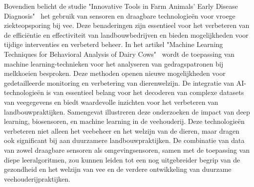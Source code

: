 \newline
Bovendien belicht de studie "Innovative Tools in Farm Animals’ Early Disease Diagnosis"~\autocite{Animals13780} het gebruik van sensoren en draagbare technologieën voor vroege ziekteopsporing bij vee. 
Deze benaderingen zijn essentieel voor het verbeteren van de efficiëntie en effectiviteit van landbouwbedrijven en bieden mogelijkheden voor tijdige interventies en verbeterd beheer.
\newline
In het artikel "Machine Learning Techniques for Behavioral Analysis of Dairy Cows"~\autocite{ar5iv2021} wordt de toepassing van machine learning-technieken voor het analyseren van gedragspatronen bij melkkoeien besproken. 
Deze methoden openen nieuwe mogelijkheden voor gedetailleerde monitoring en verbetering van dierenwelzijn. 
De integratie van AI-technologieën is van essentieel belang voor het decoderen van complexe datasets van veegegevens en biedt waardevolle inzichten voor het verbeteren van landbouwpraktijken.
\newline
Samengevat illustreren deze onderzoeken de impact van deep learning, biosensoren, en machine learning in de veehouderij. 
Deze technologieën verbeteren niet alleen het veebeheer en het welzijn van de dieren, maar dragen ook significant bij aan duurzamere landbouwpraktijken. 
De combinatie van data van zowel draagbare sensoren als omgevingsensoren, samen met de toepassing van diepe leeralgoritmen, zou kunnen leiden tot een nog uitgebreider begrip van de gezondheid en het welzijn van vee en de verdere ontwikkeling van duurzame veehouderijpraktijken.